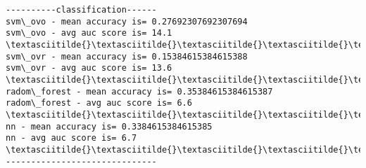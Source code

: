 \documentclass[11pt]{article}
\begin{document}
    \begin{Verbatim}[commandchars=\\\{\}]
----------classification------
svm\_ovo - mean accuracy is= 0.27692307692307694
svm\_ovo - avg auc score is= 14.1
\textasciitilde{}\textasciitilde{}\textasciitilde{}\textasciitilde{}\textasciitilde{}\textasciitilde{}\textasciitilde{}\textasciitilde{}\textasciitilde{}\textasciitilde{}\textasciitilde{}\textasciitilde{}\textasciitilde{}\textasciitilde{}\textasciitilde{}\textasciitilde{}\textasciitilde{}\textasciitilde{}\textasciitilde{}\textasciitilde{}\textasciitilde{}\textasciitilde{}\textasciitilde{}\textasciitilde{}\textasciitilde{}\textasciitilde{}\textasciitilde{}\textasciitilde{}\textasciitilde{}
svm\_ovr - mean accuracy is= 0.15384615384615388
svm\_ovr - avg auc score is= 13.6
\textasciitilde{}\textasciitilde{}\textasciitilde{}\textasciitilde{}\textasciitilde{}\textasciitilde{}\textasciitilde{}\textasciitilde{}\textasciitilde{}\textasciitilde{}\textasciitilde{}\textasciitilde{}\textasciitilde{}\textasciitilde{}\textasciitilde{}\textasciitilde{}\textasciitilde{}\textasciitilde{}\textasciitilde{}\textasciitilde{}\textasciitilde{}\textasciitilde{}\textasciitilde{}\textasciitilde{}\textasciitilde{}\textasciitilde{}\textasciitilde{}\textasciitilde{}\textasciitilde{}
radom\_forest - mean accuracy is= 0.35384615384615387
radom\_forest - avg auc score is= 6.6
\textasciitilde{}\textasciitilde{}\textasciitilde{}\textasciitilde{}\textasciitilde{}\textasciitilde{}\textasciitilde{}\textasciitilde{}\textasciitilde{}\textasciitilde{}\textasciitilde{}\textasciitilde{}\textasciitilde{}\textasciitilde{}\textasciitilde{}\textasciitilde{}\textasciitilde{}\textasciitilde{}\textasciitilde{}\textasciitilde{}\textasciitilde{}\textasciitilde{}\textasciitilde{}\textasciitilde{}\textasciitilde{}\textasciitilde{}\textasciitilde{}\textasciitilde{}\textasciitilde{}
nn - mean accuracy is= 0.3384615384615385
nn - avg auc score is= 6.7
\textasciitilde{}\textasciitilde{}\textasciitilde{}\textasciitilde{}\textasciitilde{}\textasciitilde{}\textasciitilde{}\textasciitilde{}\textasciitilde{}\textasciitilde{}\textasciitilde{}\textasciitilde{}\textasciitilde{}\textasciitilde{}\textasciitilde{}\textasciitilde{}\textasciitilde{}\textasciitilde{}\textasciitilde{}\textasciitilde{}\textasciitilde{}\textasciitilde{}\textasciitilde{}\textasciitilde{}\textasciitilde{}\textasciitilde{}\textasciitilde{}\textasciitilde{}\textasciitilde{}
------------------------------

    \end{Verbatim}
\end{document}
